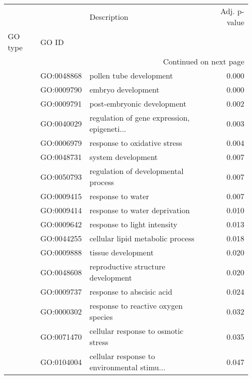\begin{longtable}{lllr}
\toprule
   &            &                                  Description &  Adj. p-value \\
GO type & GO ID &                                              &               \\
\midrule
\endhead
\midrule
\multicolumn{4}{r}{{Continued on next page}} \\
\midrule
\endfoot

\bottomrule
\endlastfoot
\multirow{23}{*}{BP} & GO:0048868 &                      pollen tube development &         0.000 \\
   & GO:0009790 &                           embryo development &         0.000 \\
   & GO:0009791 &                   post-embryonic development &         0.002 \\
   & GO:0040029 &  regulation of gene expression, epigeneti... &         0.003 \\
   & GO:0006979 &                 response to oxidative stress &         0.004 \\
   & GO:0048731 &                           system development &         0.007 \\
   & GO:0050793 &          regulation of developmental process &         0.007 \\
   & GO:0009415 &                            response to water &         0.007 \\
   & GO:0009414 &                response to water deprivation &         0.010 \\
   & GO:0009642 &                  response to light intensity &         0.013 \\
   & GO:0044255 &             cellular lipid metabolic process &         0.018 \\
   & GO:0009888 &                           tissue development &         0.020 \\
   & GO:0048608 &           reproductive structure development &         0.020 \\
   & GO:0009737 &                    response to abscisic acid &         0.024 \\
   & GO:0000302 &          response to reactive oxygen species &         0.032 \\
   & GO:0071470 &          cellular response to osmotic stress &         0.035 \\
   & GO:0104004 &  cellular response to environmental stimu... &         0.047 \\

\end{longtable}
